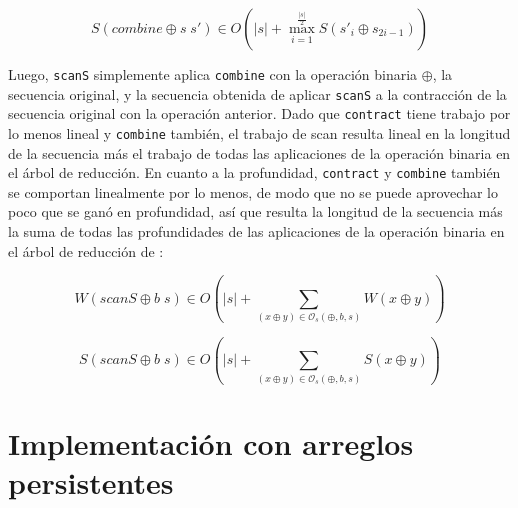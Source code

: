 \documentclass[a4paper,10pt]{article}
\begin{document}
\begin{equation*}
    S \left( combine \oplus s \; s' \right) \in
    O \left( \vert s \vert + \max_{i=1}^{\frac{\vert s \vert}{2}} S \left( s'_{i} \oplus s_{2i - 1} \right) \right)
\end{equation*}

Luego, \texttt{scanS} simplemente aplica \texttt{combine} con la operación binaria
$\oplus$, la secuencia original, y la secuencia obtenida de aplicar \texttt{scanS}
a la contracción de la secuencia original con la operación anterior. Dado que
\texttt{contract} tiene trabajo por lo menos lineal y \texttt{combine} también,
el trabajo de scan resulta lineal en la longitud de la secuencia más el trabajo
de todas las aplicaciones de la operación binaria en el árbol de reducción. En
cuanto a la profundidad, \texttt{contract} y \texttt{combine} también se comportan
linealmente por lo menos, de modo que no se puede aprovechar lo poco que se ganó
en profundidad, así que resulta la longitud de la secuencia más la suma de todas
las profundidades de las aplicaciones de la operación binaria en el árbol de
reducción de :

\begin{equation*}
    W \left( scanS \oplus b \; s \right) \in
    O \left( \vert s \vert + \sum_{(x \oplus y) \in \mathcal{O}_s(\oplus,b,s)} W \left( x \oplus y \right) \right)
\end{equation*}

\begin{equation*}
    S \left( scanS \oplus b \; s \right) \in
    O \left( \vert s \vert + \sum_{(x \oplus y) \in \mathcal{O}_s(\oplus,b,s)} S \left( x \oplus y \right) \right)
\end{equation*}

\newpage{}
































\part*{Implementación con arreglos persistentes}
\end{document}
